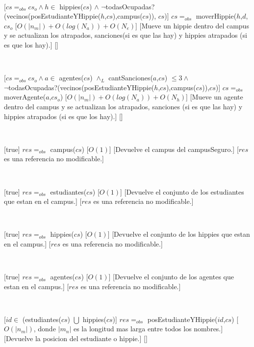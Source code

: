 ~

[$cs =_{obs} cs_o \land h \in$ hippies($cs$) $\land$ $\neg$todasOcupadas?(vecinos(posEstudianteYHippie($h$,$cs$),campus($cs$)), $cs$)]
{$cs =_{obs}$ moverHippie($h$,$d$,$cs_o$}
[$O(|n_m|) + O(log(N_a)) + O(N_e)$]
[Mueve un hippie dentro del campus y se actualizan los atrapados, sanciones(si es que las hay) y hippies atrapados (si es que los hay).]
[]

~

[$cs =_{obs} cs_o \land a \in$ agentes($cs$) $\land_L$ cantSanciones($a$,$cs$) $\leq 3 \land$ \\
$\neg$todasOcupadas?(vecinos(posEstudianteYHippie($h$,$cs$),campus($cs$)),$cs$)]
{$cs =_{obs}$ moverAgente($a$,$cs_o$)}
[$O(|n_m|) + O(log(N_a)) + O(N_h)$]
[Mueve un agente dentro del campus y se actualizan los atrapados, sanciones (si es que las hay) y hippies atrapados (si es que los hay).]
[]

~

[true]
{$res =_{obs}$ campus($cs$)}
[$O(1)$]
[Devuelve el campus del campusSeguro.]
[$res$ es una referencia no modificable.]

~

[true]
{$res =_{obs}$ estudiantes($cs$)}
[$O(1)$]
[Devuelve el conjunto de los estudiantes que estan en el campus.]
[$res$ es una referencia no modificable.]

~

[true]
{$res =_{obs}$ hippies($cs$)}
[$O(1)$]
[Devuelve el conjunto de los hippies que estan en el campus.]
[$res$ es una referencia no modificable.]

~

[true]
{$res =_{obs}$ agentes($cs$)}
[$O(1)$]
[Devuelve el conjunto de los agentes que estan en el campus.]
[$res$ es una referencia no modificable.]

~

[$id \in$ (estudiantes($cs$) $\bigcup$ hippies($cs$)]
{$res =_{obs}$ posEstudianteYHippie($id$,$cs$)}
[$O(|n_m|)$, donde $|m_n|$ es la longitud mas larga entre todos los nombres.]
[Devuelve la posicion del estudiante o hippie.]
[]

